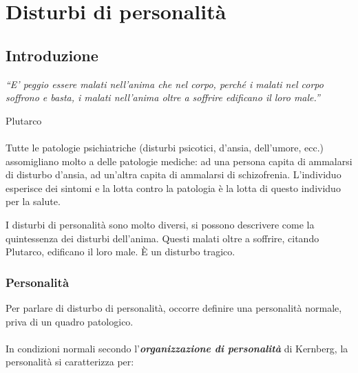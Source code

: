 \section{Disturbi di personalità}

\subsection{Introduzione}

\emph{``E' peggio essere malati nell'anima che nel corpo, perché i
malati nel corpo soffrono e basta, i malati nell'anima oltre a soffrire
edificano il loro male.''}

Plutarco
\\\\
Tutte le patologie psichiatriche (disturbi psicotici, d'ansia,
dell'umore, ecc.) assomigliano molto a delle patologie mediche: ad una
persona capita di ammalarsi di disturbo d'ansia, ad un'altra capita di
ammalarsi di schizofrenia. L'individuo esperisce dei sintomi e la lotta
contro la patologia è la lotta di questo individuo per la salute.

I disturbi di personalità sono molto diversi, si possono descrivere come
la quintessenza dei disturbi dell'anima. Questi malati oltre a soffrire,
citando Plutarco, edificano il loro male. È un disturbo tragico.

\subsubsection{Personalità}

Per parlare di disturbo di personalità, occorre definire una personalità
normale, priva di un quadro patologico.
\\\\
In condizioni normali secondo l'\textbf{\emph{organizzazione di
personalità}} di Kernberg, la personalità si caratterizza per:

